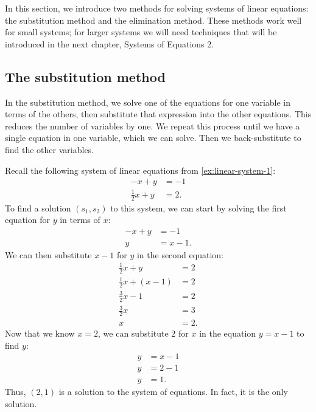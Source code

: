 \documentclass{article}
\begin{document}
In this section, we introduce two methods for solving systems of linear equations: the substitution method and the elimination method. These methods work well for small systems; for larger systems we will need techniques that will be introduced in the next chapter, Systems of Equations 2.

\subsection*{The substitution method}\label{subsec:substitution-method}

In the substitution method, we solve one of the equations for one variable in terms of the others, then substitute that expression into the other equations. This reduces the number of variables by one. We repeat this process until we have a single equation in one variable, which we can solve. Then we back-substitute to find the other variables.

\begin{example}\label{ex:substitution-method-1}
Recall the following system of linear equations from \cref{ex:linear-system-1}:
\begin{align*}
    -x+y&=-1 \\
    \frac{1}{2}x+y&=2.
\end{align*}
To find a solution \((s_1, s_2)\) to this system, we can start by solving the first equation for \(y\) in terms of \(x\):
\begin{align*}
    -x+y&=-1 \\
    y&=x-1.
\end{align*}
We can then substitute \(x-1\) for \(y\) in the second equation:
\begin{align*}
    \frac{1}{2}x+y&=2 \\
    \frac{1}{2}x+(x-1)&=2 \\
    \frac{3}{2}x-1&=2 \\
    \frac{3}{2}x&=3 \\
    x&=2.
\end{align*}
Now that we know \(x=2\), we can substitute \(2\) for \(x\) in the equation \(y=x-1\) to find \(y\):
\begin{align*}
    y&=x-1 \\
    y&=2-1 \\
    y&=1.
\end{align*}
Thus, \((2, 1)\) is a solution to the system of equations. In fact, it is the only solution.
\end{example}
\end{document}
